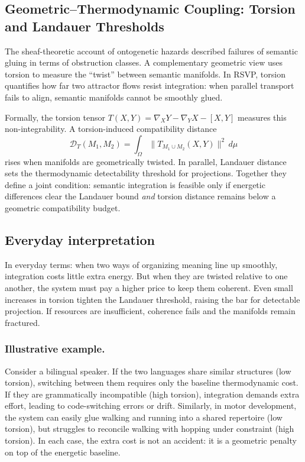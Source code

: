 \documentclass[a4paper,11pt]{article}
\begin{document}
\subsection{Geometric--Thermodynamic Coupling: Torsion and Landauer Thresholds}

The sheaf-theoretic account of ontogenetic hazards described failures of
semantic gluing in terms of obstruction classes. A complementary geometric
view uses torsion to measure the ``twist'' between semantic manifolds. In RSVP,
torsion quantifies how far two attractor flows resist integration: when
parallel transport fails to align, semantic manifolds cannot be smoothly glued.

Formally, the torsion tensor $T(X,Y)=\nabla_X Y-\nabla_Y X-[X,Y]$ measures this
non-integrability. A torsion-induced compatibility distance
\begin{equation}
\mathcal{D}_T(M_1,M_2)=\int_\Omega \|T_{M_1\cup M_2}(X,Y)\|^2\,d\mu
\end{equation}
rises when manifolds are geometrically twisted. In parallel, Landauer distance
sets the thermodynamic detectability threshold for projections. Together they
define a joint condition: semantic integration is feasible only if energetic
differences clear the Landauer bound \emph{and} torsion distance remains below
a geometric compatibility budget.

\subsection{Everyday interpretation}

In everyday terms: when two ways of organizing meaning line up smoothly,
integration costs little extra energy. But when they are twisted relative to
one another, the system must pay a higher price to keep them coherent. Even
small increases in torsion tighten the Landauer threshold, raising the bar for
detectable projection. If resources are insufficient, coherence fails and the
manifolds remain fractured.

\subsubsection{Illustrative example.}
Consider a bilingual speaker. If the two languages share similar structures
(low torsion), switching between them requires only the baseline thermodynamic
cost. If they are grammatically incompatible (high torsion), integration
demands extra effort, leading to code-switching errors or drift. Similarly, in
motor development, the system can easily glue walking and running into a shared repertoire (low torsion), but struggles to reconcile
walking with hopping under constraint (high torsion). In each case, the extra
cost is not an accident: it is a geometric penalty on top of the energetic
baseline.
\end{document}
